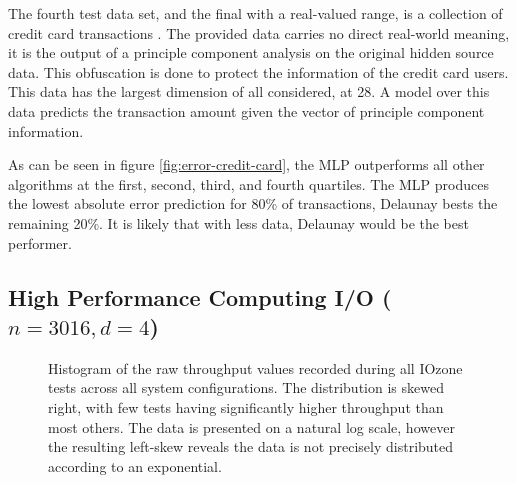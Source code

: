 \documentclass[smallextended,final]{svjour3}       %
\begin{document}
The fourth test data set, and the final with a real-valued range, is a collection of credit card transactions \cite{pozzolo2015calibrating}. The provided data carries no direct real-world meaning, it is the output of a principle component analysis on the original hidden source data. This obfuscation is done to protect the information of the credit card users. This data has the largest dimension of all considered, at 28. A model over this data predicts the transaction amount given the vector of principle component information.

As can be seen in figure \ref{fig:error-credit-card}, the MLP outperforms all other algorithms at the first, second, third, and fourth quartiles. The MLP produces the lowest absolute error prediction for 80\% of transactions, Delaunay bests the remaining 20\%. It is likely that with less data, Delaunay would be the best performer.


\subsection{High Performance Computing I/O ($n = 3016, d = 4$)}

\begin{figure}
  \centering
  \caption{Histogram of the raw throughput values recorded during all IOzone tests across all system configurations. The distribution is skewed right, with few tests having significantly higher throughput than most others. The data is presented on a natural log scale, however the resulting left-skew reveals the data is not precisely distributed according to an exponential.}
  \label{fig:hist-throughput}
\end{figure}
\end{document}

